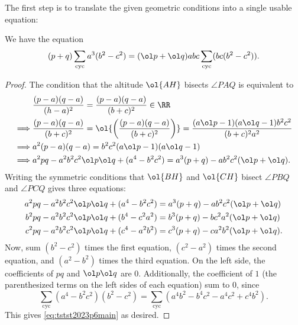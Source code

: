 The first step is to translate the given geometric conditions into a single
usable equation:
\begin{claim*}
  We have the equation
  \begin{equation}
    (p+q)\sum_{\text{cyc}}a^3(b^2-c^2)
    = (\ol p+\ol q)abc\sum_{\text{cyc}}(bc(b^2-c^2)).
    \label{eq:tstst2023p6main}
  \end{equation}
\end{claim*}
\begin{proof}
  The condition that the altitude $\ol{AH}$ bisects $\angle PAQ$ is equivalent to
  \begin{align*}
    & \frac{(p-a)(q-a)}{(h-a)^2} = \frac{(p-a)(q-a)}{(b+c)^2}\in\RR \\
    \implies &\frac{(p-a)(q-a)}{(b+c)^2} = \ol{\left(\frac{(p-a)(q-a)}{(b+c)^2}\right)}
    = \frac{(a\ol p-1)(a\ol q-1)b^2c^2}{(b+c)^2a^2} \\
    \implies & a^2(p-a)(q-a) = b^2c^2(a\ol p-1)(a\ol q-1) \\
    \implies & a^2pq-a^2b^2c^2\ol p\ol q+(a^4-b^2c^2)
      = a^3(p+q)-ab^2c^2(\ol p+\ol q).
    \end{align*}
  Writing the symmetric conditions that $\ol{BH}$ and $\ol{CH}$
  bisect $\angle PBQ$ and $\angle PCQ$ gives three equations:
  \begin{align*}
    a^2pq - a^2b^2c^2\ol p\ol q + (a^4-b^2c^2)
      &= a^3(p+q) - ab^2c^2(\ol p+\ol q) \\
    b^2pq - a^2b^2c^2\ol p\ol q + (b^4-c^2a^2)
      &= b^3(p+q) - bc^2a^2(\ol p+\ol q) \\
    c^2pq - a^2b^2c^2\ol p\ol q + (c^4-a^2b^2)
      &=c^3(p+q) - ca^2b^2(\ol p+\ol q).
  \end{align*}
  Now, sum $(b^2-c^2)$ times the first equation,
  $(c^2-a^2)$ times the second equation, and $(a^2-b^2)$ times the third equation.
  On the left side, the coefficients of $pq$ and $\ol p\ol q$ are $0$.
  Additionally, the coefficient of $1$
  (the parenthesized terms on the left sides of each equation) sum to $0$, since
  \[ \sum_{\text{cyc}}(a^4-b^2c^2)(b^2-c^2)
    = \sum_{\text{cyc}}(a^4b^2-b^4c^2-a^4c^2+c^4b^2). \]
  This gives \eqref{eq:tstst2023p6main} as desired.
\end{proof}

